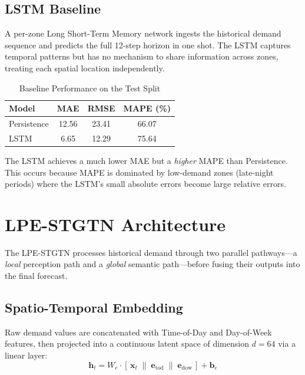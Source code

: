 \documentclass{rapportECL}
\begin{document}
\subsection{LSTM Baseline}
A per-zone Long Short-Term Memory network ingests the historical demand sequence and predicts the full 12-step horizon in one shot. The LSTM captures temporal patterns but has no mechanism to share information across zones, treating each spatial location independently.

\begin{table}[H]
\centering
\caption{Baseline Performance on the Test Split}
\label{tab:baselines}
\begin{tabular}{@{}lccc@{}}
\toprule
\textbf{Model} & \textbf{MAE} & \textbf{RMSE} & \textbf{MAPE (\%)} \\ \midrule
Persistence & 12.56 & 23.41 & 66.07 \\
LSTM        &  6.65 & 12.29 & 75.64 \\ \bottomrule
\end{tabular}
\end{table}

The LSTM achieves a much lower MAE but a \emph{higher} MAPE than Persistence. This occurs because MAPE is dominated by low-demand zones (late-night periods) where the LSTM's small absolute errors become large relative errors.

\section{LPE-STGTN Architecture}

The LPE-STGTN processes historical demand through two parallel pathways---a \emph{local} perception path and a \emph{global} semantic path---before fusing their outputs into the final forecast.

\subsection{Spatio-Temporal Embedding}
Raw demand values are concatenated with Time-of-Day and Day-of-Week features, then projected into a continuous latent space of dimension $d=64$ via a linear layer:
\begin{equation}
\mathbf{h}_t = W_e \cdot [\,\mathbf{x}_t \;\|\; \mathbf{e}_{\text{tod}} \;\|\; \mathbf{e}_{\text{dow}}\,] + \mathbf{b}_e
\end{equation}
\end{document}
